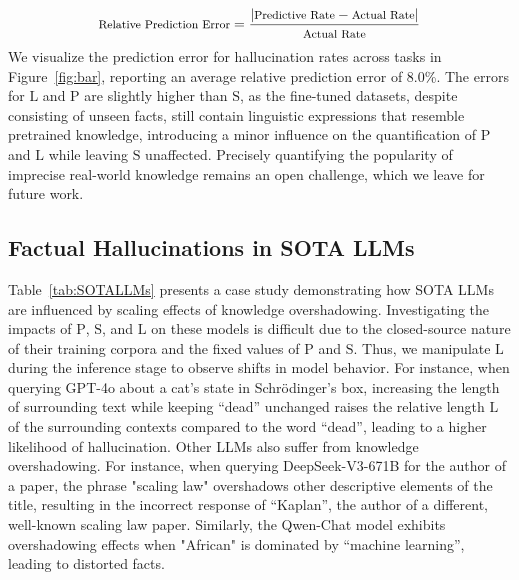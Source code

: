 \vspace{-1.2em}
\begin{equation}
\fontsize{8}{8}\selectfont
\text{Relative Prediction Error} = \frac{|\text{Predictive Rate} - \text{Actual Rate}|}{\text{Actual Rate}}
\end{equation}
\vspace{-0.2em}
We visualize the prediction error for hallucination rates across tasks in Figure~\ref{fig:bar}, reporting an average relative prediction error of 8.0\%. The errors for $\text{L}$ and $\text{P}$ are slightly higher than $\text{S}$, as the fine-tuned datasets, despite consisting of unseen facts, still contain linguistic expressions that resemble pretrained knowledge, introducing a minor influence on the quantification of $\text{P}$ and $\text{L}$ while leaving $\text{S}$ unaffected.
Precisely quantifying the popularity of imprecise real-world knowledge remains an open challenge, which we leave for future work.




\subsection{Factual Hallucinations in SOTA LLMs}
Table~\ref{tab:SOTALLMs} presents a case study demonstrating how SOTA LLMs are influenced by scaling effects of knowledge overshadowing. Investigating the impacts of $\text{P}$, $\text{S}$, and $\text{L}$ on these models is difficult due to the closed-source nature of their training corpora and the fixed values of $\text{P}$ and $\text{S}$. Thus, we manipulate $\text{L}$ during the inference stage to observe shifts in model behavior.
For instance, when querying GPT-4o about a cat’s state in Schrödinger’s box, increasing the length of surrounding text while keeping ``dead'' unchanged raises the relative length $\text{L}$ of the surrounding contexts compared to the word ``dead'', leading to a higher likelihood of hallucination.
Other LLMs also suffer from knowledge overshadowing. For instance, when querying DeepSeek-V3-671B for the author of a paper, the phrase "scaling law" overshadows other descriptive elements of the title, resulting in the incorrect response of ``Kaplan'', the author of a different, well-known scaling law paper. Similarly, the Qwen-Chat model exhibits overshadowing effects when "African" is dominated by ``machine learning'', leading to distorted facts.




